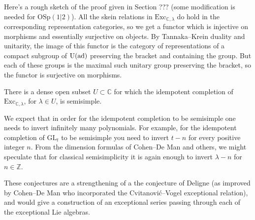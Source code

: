\documentclass[12pt]{amsart}
\begin{document}
Here's a rough sketch of the proof given in Section ??? (some modification is
needed for $\mathrm{OSp}(1|2)$).  All the skein relations in
$\mathrm{Exc}_{\mathbb{C},\lambda}$ do hold in the corresponding
representation categories, so we get a functor which is injective on morphisms
and essentially surjective on objects.  By Tannaka--Krein duality and
unitarity, the image of this functor is the category of representations of a
compact subgroup of $\mathrm{U}(\operatorname{ad})$ preserving the bracket and containing
the group.  But each of these groups is the maximal such unitary group
preserving the bracket, so the functor is surjective on morphisms.



\begin{conjecture}
There is a dense open subset $U \subset \mathbb{C}$ for which the idempotent
completion of $\mathrm{Exc}_{\mathbb{C},\lambda}$, for $\lambda \in U$, is
semisimple.
\end{conjecture}

We expect that in order for the idempotent completion to be semisimple one
needs to invert infinitely many polynomials.  For example, for the idempotent
completion of $\mathrm{GL}_t$ to be semisimple you need to invert $t-n$ for
every positive integer $n$.  From the dimension formulas of Cohen--De Man and
others, we might speculate that for classical semisimplicity it is again
enough to invert $\lambda-n$ for $n \in \mathbb{Z}$.

These conjectures are a strengthening of a the conjecture of Deligne (as
improved by Cohen--De Man who incorporated the Cvitanović--Vogel exceptional
relation), and would give a construction of an exceptional series passing
through each of the exceptional Lie algebras.
\end{document}
